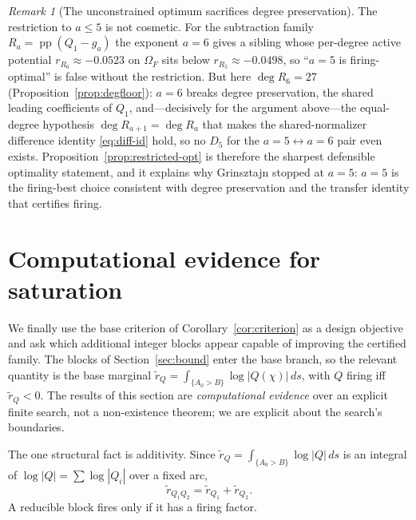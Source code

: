 \documentclass[11pt,reqno]{amsart}
\theoremstyle{plain}
\theoremstyle{definition}
\theoremstyle{remark}
\newtheorem{remark}[theorem]{Remark}
\DeclareMathOperator{\pp}{pp}
\newcommand{\rb}[1]{r_{#1}}   %
\begin{document}
\begin{remark}[The unconstrained optimum sacrifices degree preservation]
\label{rem:a6}
The restriction to $a\le5$ is not cosmetic. For the subtraction family
$R_a=\pp(Q_1-g_a)$ the exponent $a=6$ gives a sibling whose per-degree active potential
$\rb{R_6}\approx-0.0523$ on $\Omega_F$ sits below $\rb{R_5}\approx-0.0498$, so ``$a=5$ is
firing-optimal'' is false without the restriction. But here
$\deg R_6=27$ (Proposition~\ref{prop:degfloor}): $a=6$ breaks degree preservation, the
shared leading coefficients of $Q_1$, and---decisively for the argument
above---the equal-degree hypothesis $\deg R_{a+1}=\deg R_a$ that makes the
shared-normalizer difference identity \eqref{eq:diff-id} hold, so no $D_5$ for the
$a=5\leftrightarrow a=6$ pair even exists. Proposition~\ref{prop:restricted-opt} is
therefore the sharpest defensible optimality statement, and it explains why Grinsztajn
stopped at $a=5$: $a=5$ is the firing-best choice consistent with degree preservation
and the transfer identity that certifies firing.
\end{remark}

\section{Computational evidence for saturation}\label{sec:saturation}

We finally use the base criterion of Corollary~\ref{cor:criterion} as a design objective and ask which additional integer blocks appear capable of improving the certified family. The blocks of Section~\ref{sec:bound} enter the base branch,
so the relevant quantity is the base marginal
$\widetilde r_Q=\int_{\{A_0>B\}}\log|Q(\chi)|\,ds$, with $Q$ firing iff
$\widetilde r_Q<0$. The results of this section are \emph{computational evidence} over
an explicit finite search, not a non-existence theorem; we are explicit about the
search's boundaries.

The one structural fact is additivity. Since
$\widetilde r_Q=\int_{\{A_0>B\}}\log|Q|\,ds$ is an integral of $\log|Q|=\sum\log|Q_i|$
over a fixed arc,
\begin{equation}\label{eq:additive}
  \widetilde r_{Q_1Q_2}=\widetilde r_{Q_1}+\widetilde r_{Q_2}.
\end{equation}
A reducible block fires only if it has a firing factor.
\end{document}
